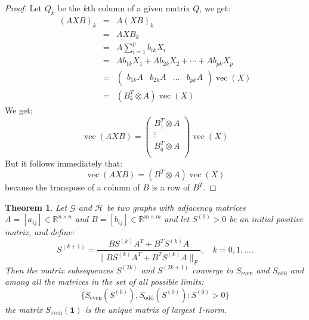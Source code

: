 \documentclass[a4paper,11pt]{report}
\newtheorem{theorem}{Theorem}[section]
\newcommand{\R}{{\mathbb R}}
\newcommand{\graf}{\mathscr{G}}
\newcommand{\grafeen}{\mathscr{H}}
\newcommand{\vect}{\operatorname{vec}}
\begin{document}
\begin{proof}
  Let $Q_k$ be the $k$th column of a given matrix $Q$, we get:
  \begin{eqnarray*}
    (AXB)_k &=& A(XB)_k\\
    &=& AXB_k\\
    &=& A \sum_{i=1}^p b_{ik}X_{i}\\
    &=& Ab_{1k}X_1 + Ab_{2k}X_2 + \cdots + Ab_{pk}X_p\\
    &=& \begin{pmatrix}
    b_{1k}A & b_{2k}A & \ldots & b_{pk}A \end{pmatrix}\vect(X)\\
    &=& (B^T_k \otimes A)\vect(X)
  \end{eqnarray*}
 We get:
 $$\vect(AXB) = \begin{pmatrix} 
 B^T_1 \otimes A\\
 \vdots\\
 B^T_q \otimes A\\
 \end{pmatrix} \vect(X)$$
 But it follows immediately that:
 $$\vect(AXB) = (B^T\otimes A)\vect(X)$$
 because the transpose of a column of $B$ is a row of $B^T$.
\end{proof}

\begin{theorem}\label{frobvorm}
  Let $\graf$ and $\grafeen$ be two graphs with adjacency matrices $A = [a_{ij}] \in \R^{n\times n}$ 
  and $B = [b_{ij}] \in \R^{m\times m}$ and let $S^{(0)} > 0$ be an initial positive matrix, and 
  define:
  $$S^{(k+1)} = \frac{BS^{(k)}A^T + B^TS^{(k)}A}{\|BS^{(k)}A^T + B^TS^{(k)}A\|_F}, \quad k = 
  0,1,\ldots.$$
  Then the matrix subsequences $S^{(2k)}$ and $S^{(2k+1)}$ converge to $S_\text{even}$ 
  and $S_\text{odd}$ and among all the matrices in the set of all possible 
  limits:
  $$\{S_\text{even}(S^{(0)}), S_\text{odd}(S^{(0)}): S^{(0)} > 0 \}$$
  the matrix $S_\text{even}(\mathbf{1})$ is the unique matrix of largest 
  1-norm.
  \end{theorem}
\end{document}
